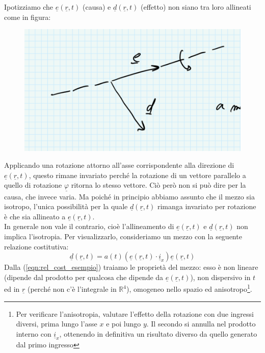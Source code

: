 \documentclass{book}
\begin{document}
            Ipotizziamo che $\underline{e}(\underline{r},t)$ (causa) e $\underline{d}(\underline{r},t)$ (effetto) non siano tra loro allineati come in figura:
            \begin{figure}[h!]
                \centering
                \includegraphics[width=0.5\linewidth]{img//Chapter_one/chaptOneIsotropia.png}
                \label{fig:isotropia}
                \caption{}
            \end{figure}
            Applicando una rotazione attorno all'asse corrispondente alla direzione di $\underline{e}(\underline{r},t)$, questo rimane invariato perché la rotazione di un vettore parallelo a quello di rotazione $\underline{\varphi}$ ritorna lo stesso vettore. Ciò però non si può dire per la causa, che invece varia. Ma poiché in principio abbiamo assunto che il mezzo sia isotropo, l'unica possibilità per la quale $\underline{d}(\underline{r},t)$ rimanga invariato per rotazione è che sia allineato a $\underline{e}(\underline{r},t)$. \\
            In generale non vale il contrario, cioè l'allineamento di $\underline{e}(\underline{r},t)$ e $\underline{d}(\underline{r},t)$ non implica l'isotropia. Per visualizzarlo, consideriamo un mezzo con la seguente relazione costitutiva:
            \begin{equation}
                \label{eqn:rel_cost_esempio}
                \underline{d}(\underline{r},t) = a(t) (\underline{e}(\underline{r},t) \cdot \underline{i}_{x})\underline{e}(\underline{r},t)
            \end{equation}
            Dalla (\ref{eqn:rel_cost_esempio}) traiamo le proprietà del mezzo: esso è non lineare (dipende dal prodotto per qualcosa che dipende da $\underline{e}(\underline{r},t)$), non dispersivo in $t$ ed in $\underline{r}$ (perché non c'è l'integrale in $\mathbb{R} ^{4}$), omogeneo nello spazio ed anisotropo\footnote{Per verificare l'anisotropia, valutare l'effetto della rotazione con due ingressi diversi, prima lungo l'asse $x$ e poi lungo $y$. Il secondo si annulla nel prodotto interno con $\underline{i}_{x}$, ottenendo in definitiva un risultato diverso da quello generato dal primo ingresso}.
\end{document}
